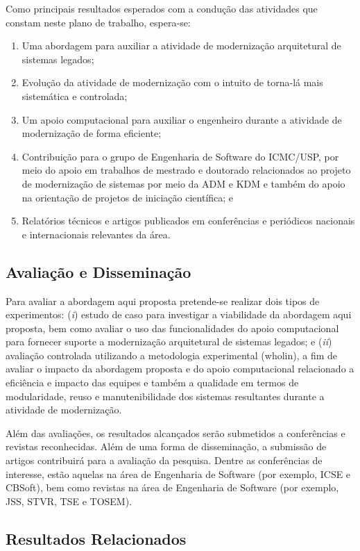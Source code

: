 \documentclass[12pt]{article}
\begin{document}
Como principais resultados esperados com a condução das atividades que constam neste plano de trabalho, espera-se:

\begin{enumerate}
\item Uma abordagem para auxiliar a atividade de modernização arquitetural de sistemas legados;
\item Evolução da atividade de modernização com o intuito de torna-lá mais sistemática e controlada;
\item Um apoio computacional para auxiliar o engenheiro durante a atividade de modernização de forma eficiente;
\item Contribuição para o grupo de Engenharia de Software do ICMC/USP, por meio do apoio em trabalhos de mestrado e doutorado relacionados ao projeto de modernização de sistemas por meio da ADM e KDM e também do apoio na orientação de projetos de iniciação científica; e
\item Relatórios técnicos e artigos publicados em conferências e periódicos nacionais e internacionais relevantes da área.
\end{enumerate}

\subsection{Avaliação e Disseminação}

Para avaliar a abordagem aqui proposta pretende-se realizar dois tipos de experimentos: (\textit{i}) estudo de caso para investigar a viabilidade da abordagem aqui proposta, bem como avaliar o uso das funcionalidades do apoio computacional para fornecer suporte a modernização arquitetural de sistemas legados; e (\textit{ii}) avaliação controlada utilizando a metodologia experimental (wholin), a fim de avaliar o impacto da abordagem proposta e do apoio computacional relacionado a eficiência e impacto das equipes e também a qualidade em termos de modularidade, reuso e manutenibilidade dos sistemas resultantes durante a atividade de modernização.

Além das avaliações, os resultados alcançados serão submetidos a conferências e revistas reconhecidas. Além de uma forma de disseminação, a submissão de artigos contribuirá para a avaliação da pesquisa. Dentre as conferências de interesse, estão aquelas na área de Engenharia de Software (por exemplo, ICSE e CBSoft), bem como revistas na área de Engenharia de Software (por exemplo, JSS, STVR, TSE e TOSEM).

\subsection{Resultados Relacionados}
\end{document}
